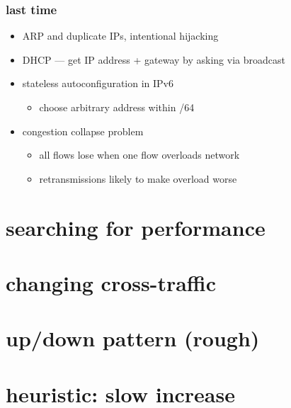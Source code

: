 \date{}
\title{}
\date{}
\usepackage{pgfplots}
\pgfplotsset{compat=1.16}

\begin{frame}
    \titlepage
\end{frame}



\begin{frame}
\frametitle{last time}
\begin{itemize}
\item ARP and duplicate IPs, intentional hijacking
\item DHCP --- get IP address + gateway by asking via broadcast
\item stateless autoconfiguration in IPv6
    \begin{itemize}
        \item choose arbitrary address within /64
    \end{itemize}
\item congestion collapse problem
    \begin{itemize}
    \item all flows lose when one flow overloads network
    \item retransmissions likely to make overload worse
    \end{itemize}
\end{itemize}
\end{frame}

\section{searching for performance}


\section{changing cross-traffic}


\section{up/down pattern (rough)}


\section{heuristic: slow increase}


